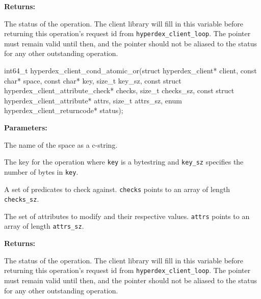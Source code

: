 \noindent\textbf{Returns:}
\begin{description}[labelindent=\widthof{{\texttt{status}}},leftmargin=*,noitemsep,nolistsep,align=right]
\item[\texttt{status}] The status of the operation.  The client library will fill in this variable before returning this operation's request id from \texttt{hyperdex\_client\_loop}.  The pointer must remain valid until then, and the pointer should not be aliased to the status for any other outstanding operation.
\end{description}

\funcsep
\begin{ccode}
int64_t hyperdex_client_cond_atomic_or(struct hyperdex_client* client,
                const char* space,
                const char* key, size_t key_sz,
                const struct hyperdex_client_attribute_check* checks, size_t checks_sz,
                const struct hyperdex_client_attribute* attrs, size_t attrs_sz,
                enum hyperdex_client_returncode* status);
\end{ccode}
\funcdesc 

\noindent\textbf{Parameters:}
\begin{description}[labelindent=\widthof{{\texttt{checks}, \texttt{checks\_sz}}},leftmargin=*,noitemsep,nolistsep,align=right]
\item[\texttt{space}] The name of the space as a c-string.
\item[\texttt{key}, \texttt{key\_sz}] The key for the operation where \texttt{key} is a bytestring and \texttt{key\_sz} specifies the number of bytes in \texttt{key}.
\item[\texttt{checks}, \texttt{checks\_sz}] A set of predicates to check against.  \texttt{checks} points to an array of length \texttt{checks\_sz}.
\item[\texttt{attrs}, \texttt{attrs\_sz}] The set of attributes to modify and their respective values.  \texttt{attrs} points to an array of length \texttt{attrs\_sz}.
\end{description}

\noindent\textbf{Returns:}
\begin{description}[labelindent=\widthof{{\texttt{status}}},leftmargin=*,noitemsep,nolistsep,align=right]
\item[\texttt{status}] The status of the operation.  The client library will fill in this variable before returning this operation's request id from \texttt{hyperdex\_client\_loop}.  The pointer must remain valid until then, and the pointer should not be aliased to the status for any other outstanding operation.
\end{description}

